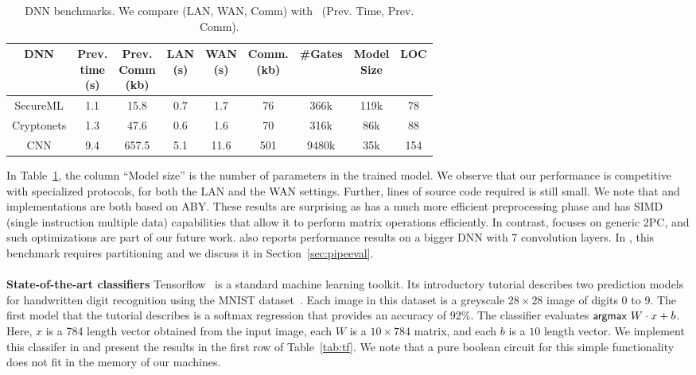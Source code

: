 \setlength\tabcolsep{2.5pt}
\begin{table}
\begin{tabular}{|c|c|c|c |c|c|c|c|c|}
\hline
DNN  & \thead{Prev. \\ time\\ (s)} & \thead{Prev. \\ Comm\\ (kb)} & \thead{LAN  \\ (s)} & \thead{WAN\\ (s)} & \thead{Comm. \\(kb)} & \#Gates & \thead{Model\\ Size} & LOC\\
\hline
SecureML   &  1.1 & 15.8 & 0.7 & 1.7  & 76   &   366k   & 119k & 78\\
\hline
Cryptonets &  1.3 & 47.6 & 0.6 & 1.6  & 70    &  316k & 86k & 88\\
\hline
CNN        &  9.4 & 657.5& 5.1 & 11.6 & 501  & 9480k & 35k & 154\\
\hline
\end{tabular}

 \caption{DNN benchmarks. We compare \tool (LAN, WAN, Comm)
 with~\cite{minionn} (Prev. Time, Prev. Comm).}
 \label{tab:nn} 
\end{table}


In Table~\ref{tab:nn}, 
the column ``Model size'' is the number of parameters in the
trained model.
We observe that our performance is competitive with specialized
\minion protocols, for both the LAN and the WAN settings. Further, lines
of \tool source code required is still small. 
We note that \minion and \tool implementations are both based on ABY.
These results are surprising as \minion has a much more efficient
preprocessing phase and has SIMD 
(single instruction multiple data) capabilities that allow it to perform
matrix operations efficiently. In contrast, \tool focuses on generic
2PC, and such optimizations are part of our future work.
\minion also reports performance results on a bigger DNN with 7
convolution layers. In \tool, this benchmark requires partitioning and
we discuss it in Section~\ref{sec:pipeeval}.
\\\\
\noindent\textbf{State-of-the-art classifiers}
Tensorflow~\cite{tensorflow} is a standard machine learning toolkit.
Its introductory tutorial describes two prediction models for handwritten digit recognition
using the MNIST dataset~\cite{mnist}.
Each image in this dataset is a greyscale $28\times 28$ image of
digits 0 to 9.
The first model that the tutorial describes is a softmax regression
that provides an accuracy of 92\%. The classifier evaluates
$ \mathsf{argmax}\ W\cdot x+b$.
Here, $x$ is a 784 length vector obtained from the input image,
each $W$ is a $10\times 784$ matrix, and each $b$ is a $10$ length
vector.
We implement this classifer in \tool and present the results in the
first row of Table~\ref{tab:tf}. We note that a pure boolean circuit for this simple functionality does not fit in the memory of our machines.


